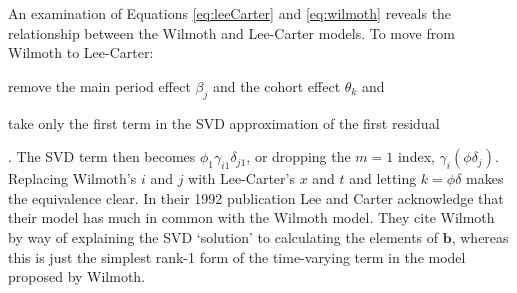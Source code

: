\documentclass[11pt]{article}
\newcommand{\mbf}{\mathbf}
\begin{document}
An examination of Equations \ref{eq:leeCarter} and \ref{eq:wilmoth} reveals the relationship between the Wilmoth and Lee-Carter models. To move from Wilmoth to Lee-Carter:
\begin{enumerate*}[label=\arabic*)]
\item remove the main period effect $\beta_j$ and the cohort effect $\theta_k$ and
\item take only the first term in the SVD approximation of the first residual
\end{enumerate*}.
The SVD term then becomes $\phi_1 \gamma_{i1} \delta_{j1}$, or dropping the $m=1$ index, $\gamma_i (\phi \delta_j)$.  Replacing Wilmoth's $i$ and $j$ with Lee-Carter's $x$ and $t$ and letting $k = \phi \delta$ makes the equivalence clear.  In their 1992 publication Lee and Carter acknowledge that their model has much in common with the Wilmoth model.  They cite Wilmoth by way of explaining the SVD `solution' to calculating the elements of $\mbf{b}$, whereas this is just the simplest rank-1 form of the time-varying term in the model proposed by Wilmoth.  
\end{document}
